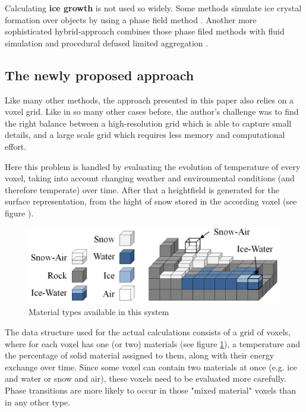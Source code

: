 Calculating \textbf{ice growth} is not used so widely. Some methods simulate ice crystal formation over objects by using a phase field method \cite{kim2003visual}. Another more sophisticated hybrid-approach combines those phase filed methods with fluid simulation and procedural defused limited aggregation \cite{kim2004hybrid}.

\subsection{The newly proposed approach}
Like many other methods, the approach presented in this paper \cite{benes2001layered} also relies on a voxel grid. Like in so many other cases before, the author's challenge was to find the right balance between a high-resolution grid which is able to capture small details, and a large scale grid which requires less memory and computational effort.

Here this problem is handled by evaluating the evolution of temperature of every voxel, taking into account changing weather and environmental conditions (and therefore temperate) over time. After that a heightfield is generated for the surface representation, from the hight of snow stored in the according voxel \cite{benes2001layered} (see figure 	\label{fig:calcpipeline}).

\begin{figure}[htb]
	\centering
	\includegraphics[width=\linewidth]{BF01/84941_1.png}
	\caption{Material types available in this system}
	\label{fig:materialtypes}
\end{figure}

The data structure used for the actual calculations consists of a grid of voxels, where for each voxel has one (or two) materials (see figure \ref{fig:materialtypes}), a temperature and the percentage of solid material assigned to them, along with their energy exchange over time. Since some voxel can contain two materials at once (e.g. ice and water or snow and air), these voxels need to be evaluated more carefully. Phase transitions are more likely to occur in those "mixed material" voxels than in any other type.

